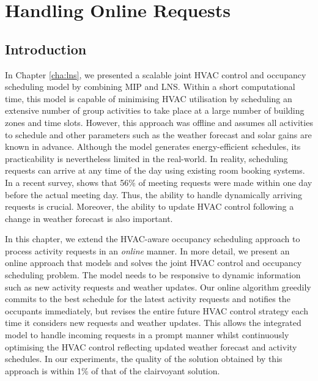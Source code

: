 

\chapter{Handling Online Requests}
\label{cha:online}

\section{Introduction}

In Chapter \ref{cha:lns}, we presented a scalable joint HVAC control and occupancy scheduling model by combining MIP and LNS. Within a short computational time, this model is capable of minimising HVAC utilisation by scheduling an extensive number of group activities to take place at a large number of building zones and time slots.
However, this approach was offline and assumes all activities to schedule and other parameters such as the weather forecast and solar gains are known in advance. Although the model generates energy-efficient schedules, its practicability is nevertheless limited in the real-world. In reality, scheduling requests can arrive at any time of the day using existing room booking systems. 
In a recent survey, \cite{kwak2013tesla} shows that 56\% of meeting requests were made within one day before the actual meeting day. Thus, the ability to handle dynamically arriving requests is crucial. Moreover, the ability to update HVAC control following a change in weather forecast is also important. 

In this chapter, we extend the HVAC-aware occupancy scheduling approach to process activity requests in an \textsl{online} manner. In more detail, we present an online approach that models and solves the joint HVAC control and occupancy scheduling problem. The model needs to be responsive to dynamic information such as new activity requests and weather updates. Our online algorithm greedily commits to the best schedule for the latest activity requests and notifies the occupants immediately, but revises the entire future HVAC control strategy each time it considers new requests and weather updates. This allows the integrated model to handle incoming requests in a prompt manner whilst continuously optimising the HVAC control reflecting updated weather forecast and activity schedules. In our experiments, the quality of the solution obtained by this approach is within 1\% of that of the clairvoyant solution. 

